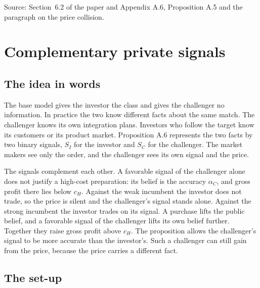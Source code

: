 {\small\color{notegrey}Source: Section~6.2 of the paper and Appendix A.6, Proposition A.5 and the paragraph on the price collision.}

\section{Complementary private signals}\label{sec:robustness-signals}

\subsection{The idea in words}

The base model gives the investor the class and gives the challenger no information.
In practice the two know different facts about the same match.
The challenger knows its own integration plans.
Investors who follow the target know its customers or its product market.
Proposition A.6 represents the two facts by two binary signals, \(S_I\) for the investor and \(S_C\) for the challenger.
The market makers see only the order, and the challenger sees its own signal and the price.

The signals complement each other.
A favorable signal of the challenger alone does not justify a high-cost preparation: its belief is the accuracy \(\alpha_C\), and gross profit there lies below \(c_H\).
Against the weak incumbent the investor does not trade, so the price is silent and the challenger's signal stands alone.
Against the strong incumbent the investor trades on its signal.
A purchase lifts the public belief, and a favorable signal of the challenger lifts its own belief further.
Together they raise gross profit above \(c_H\).
The proposition allows the challenger's signal to be more accurate than the investor's.
Such a challenger can still gain from the price, because the price carries a different fact.

\subsection{The set-up}

